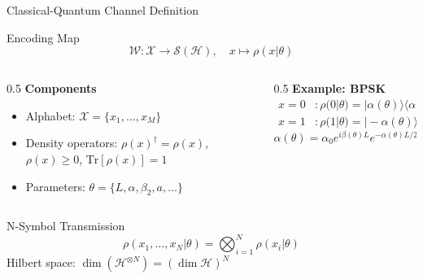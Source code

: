 \documentclass[10pt]{beamer}
\begin{document}
\begin{frame}{Classical-Quantum Channel Definition}
\begin{block}{Encoding Map}
\begin{equation*}
\mathcal{W}: \mathcal{X} \to \mathcal{S}(\mathcal{H}), \quad x \mapsto \rho(x|\theta)
\end{equation*}
\end{block}

\begin{columns}
\begin{column}{0.5\textwidth}
\textbf{Components}
\begin{itemize}
\item Alphabet: $\mathcal{X} = \{x_1, \ldots, x_M\}$
\item Density operators: $\rho(x)^\dagger = \rho(x)$, $\rho(x) \geq 0$, $\text{Tr}[\rho(x)] = 1$
\item Parameters: $\theta = \{L, \alpha, \beta_2, a, \ldots\}$
\end{itemize}
\end{column}

\begin{column}{0.5\textwidth}
\textbf{Example: BPSK}
\begin{align*}
x=0 &: \rho(0|\theta) = |\alpha(\theta)\rangle\langle\alpha(\theta)| \\
x=1 &: \rho(1|\theta) = |-\alpha(\theta)\rangle\langle-\alpha(\theta)|
\end{align*}
\begin{equation*}
\alpha(\theta) = \alpha_0 e^{i\beta(\theta)L}e^{-\alpha(\theta)L/2}
\end{equation*}
\end{column}
\end{columns}

\begin{block}{N-Symbol Transmission}
\begin{equation*}
\rho(x_1, \ldots, x_N|\theta) = \bigotimes_{i=1}^N \rho(x_i|\theta)
\end{equation*}
Hilbert space: $\dim(\mathcal{H}^{\otimes N}) = (\dim \mathcal{H})^N$
\end{block}
\end{frame}
\end{document}
